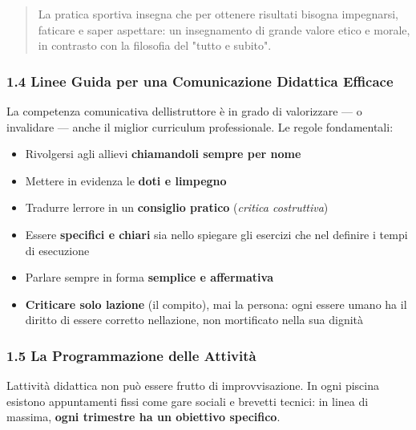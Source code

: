 \documentclass[a4paper,11pt]{article}
\providecommand{\tightlist}{%
  \setlength{\itemsep}{0pt}\setlength{\parskip}{0pt}}
\begin{document}
\begin{quote}
      La pratica sportiva insegna che per ottenere risultati bisogna
      impegnarsi, faticare e saper aspettare: un insegnamento di grande valore
      etico e morale, in contrasto con la filosofia del "tutto e subito".
\end{quote}

\subsubsection{1.4 Linee Guida per una Comunicazione Didattica
      Efficace}\label{linee-guida-per-una-comunicazione-didattica-efficace}

La competenza comunicativa dell\textquotesingle istruttore è in grado di
valorizzare --- o invalidare --- anche il miglior curriculum
professionale. Le regole fondamentali:

\begin{itemize}
      \tightlist
      \item
            Rivolgersi agli allievi \textbf{chiamandoli sempre per nome}
      \item
            Mettere in evidenza le \textbf{doti e l\textquotesingle impegno}
      \item
            Tradurre l\textquotesingle errore in un \textbf{consiglio pratico}
            (\emph{critica costruttiva})
      \item
            Essere \textbf{specifici e chiari} sia nello spiegare gli esercizi che
            nel definire i tempi di esecuzione
      \item
            Parlare sempre in forma \textbf{semplice e affermativa}
      \item
            \textbf{Criticare solo l\textquotesingle azione} (il compito), mai la
            persona: ogni essere umano ha il diritto di essere corretto
            nell\textquotesingle azione, non mortificato nella sua dignità
\end{itemize}

\subsubsection{1.5 La Programmazione delle
      Attività}\label{la-programmazione-delle-attivituxe0}

L\textquotesingle attività didattica non può essere frutto di
improvvisazione. In ogni piscina esistono appuntamenti fissi come gare
sociali e brevetti tecnici: in linea di massima, \textbf{ogni trimestre
      ha un obiettivo specifico}.
\end{document}
